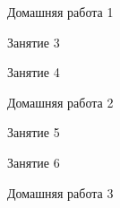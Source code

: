 \begin{class}[number=2]
\begin{listofex}
	\end{listofex}
\end{class}

\begin{homework}[number=1]
	\begin{listofex}
		\item Домашняя работа 1
	\end{listofex}
\end{homework}

\begin{class}[number=3]
	\begin{listofex}
		\item Занятие 3 
	\end{listofex}
\end{class}

\begin{class}[number=4]
	\begin{listofex}
		\item Занятие 4
	\end{listofex}
\end{class}

\begin{homework}[number=2]
	\begin{listofex}
		\item Домашняя работа 2
	\end{listofex}
\end{homework}

\begin{class}[number=5]
	\begin{listofex}
		\item Занятие 5
	\end{listofex}
\end{class}

\begin{class}[number=6]
	\begin{listofex}
		\item Занятие 6
	\end{listofex}
\end{class}

\begin{homework}[number=3]
	\begin{listofex}
		\item Домашняя работа 3
	\end{listofex}
\end{homework}

